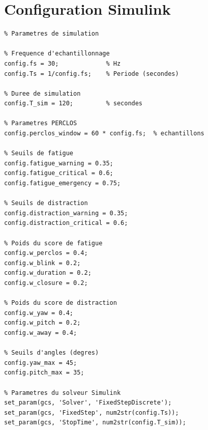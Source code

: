 \documentclass[12pt,a4paper,twoside]{report}
\begin{document}
\section{Configuration Simulink}

\begin{lstlisting}[style=matlabstyle, caption={Paramètres de configuration pour la simulation Simulink.}]
%% DMS Simulink Configuration
% Parametres de simulation

% Frequence d'echantillonnage
config.fs = 30;             % Hz
config.Ts = 1/config.fs;    % Periode (secondes)

% Duree de simulation
config.T_sim = 120;         % secondes

% Parametres PERCLOS
config.perclos_window = 60 * config.fs;  % echantillons

% Seuils de fatigue
config.fatigue_warning = 0.35;
config.fatigue_critical = 0.6;
config.fatigue_emergency = 0.75;

% Seuils de distraction
config.distraction_warning = 0.35;
config.distraction_critical = 0.6;

% Poids du score de fatigue
config.w_perclos = 0.4;
config.w_blink = 0.2;
config.w_duration = 0.2;
config.w_closure = 0.2;

% Poids du score de distraction
config.w_yaw = 0.4;
config.w_pitch = 0.2;
config.w_away = 0.4;

% Seuils d'angles (degres)
config.yaw_max = 45;
config.pitch_max = 35;

% Parametres du solveur Simulink
set_param(gcs, 'Solver', 'FixedStepDiscrete');
set_param(gcs, 'FixedStep', num2str(config.Ts));
set_param(gcs, 'StopTime', num2str(config.T_sim));
\end{lstlisting}
\end{document}
